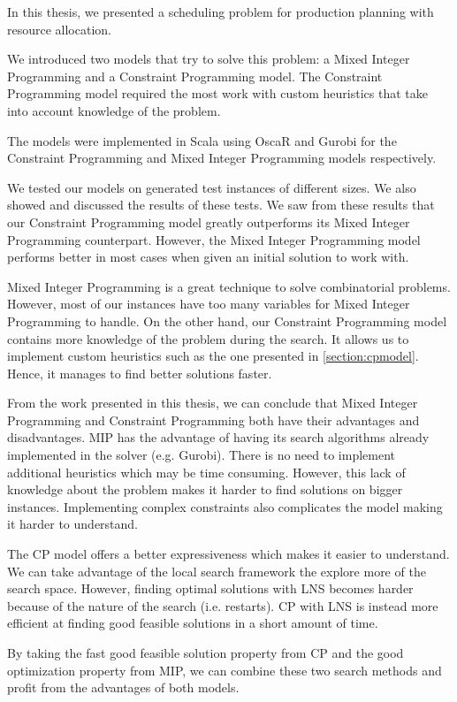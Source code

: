 \documentclass[../thesis.tex]{subfiles}
\begin{document}
In this thesis, we presented a scheduling problem for production planning 
with resource allocation.

We introduced two models that try to solve
this problem: a Mixed Integer Programming and a Constraint Programming model.
The Constraint Programming model required the most work with custom heuristics that take into account knowledge of the problem.

The models were implemented in Scala using OscaR and Gurobi for the Constraint Programming and Mixed Integer Programming models respectively.

We tested our models on generated test instances of different sizes.
We also showed and discussed the results of these tests. We saw from these results that our Constraint Programming model greatly outperforms
its Mixed Integer Programming counterpart.
However, the Mixed Integer Programming model performs better in most cases when given an initial solution 
to work with.


Mixed Integer Programming is a great technique to solve combinatorial problems. However, most of our 
instances have too many variables for Mixed Integer Programming to handle.
On the other hand,
our Constraint Programming model contains more knowledge of the problem during the search. 
It allows us to implement custom heuristics such as the one presented in \autoref{section:cpmodel}. Hence, it manages to find 
better solutions faster. 

From the work presented in this thesis, we can conclude that Mixed Integer Programming and Constraint Programming both have their advantages and disadvantages.
MIP has the advantage of having its search algorithms already implemented in the solver (e.g. Gurobi). There is no need 
to implement additional heuristics which may be time consuming. However, this lack of knowledge about the problem makes 
it harder to find solutions on bigger instances. Implementing complex constraints also complicates the model making it harder to understand. 

The CP model offers a better expressiveness which makes it easier to understand. We can take advantage of the local search 
framework the explore more of the search space. However, finding optimal solutions with LNS becomes harder because of 
the nature of the search (i.e. restarts). CP with LNS is instead more efficient at finding good feasible solutions in a 
short amount of time.

By taking the fast good feasible solution property from CP and the good optimization property from MIP, we can combine these two 
search methods and profit from the advantages of both models.
\end{document}

